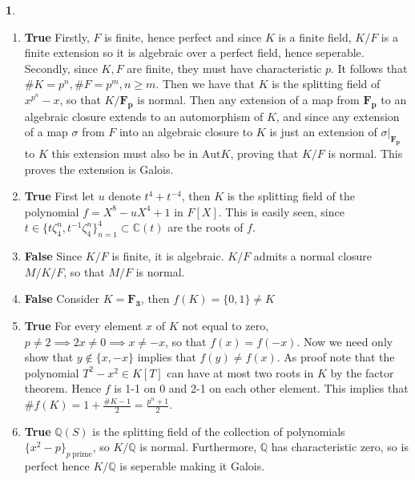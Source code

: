 \documentclass[11pt]{article}
\theoremstyle{definition}
\newtheorem{pb}{}
\newcommand{\set}[1]{\{#1\}}
\begin{document}
    \begin{pb}
        \begin{enumerate}
            \item \textbf{True} Firstly, \(F\) is finite, hence perfect and since \(K\) is a finite field, \(K/F\) is a finite extension so it is algebraic over a perfect field, hence seperable.
            Secondly, since \(K,F\) are finite, they must have characteristic \(p\). It follows that \(\# K = p^n, \# F = p^m, n \geq m\). Then we have that \(K\) is the splitting field of
            \(x^{p^n} - x\), so that \(K/\mathbf{F_p}\) is normal. Then any extension of a map from \(\mathbf{F_p}\) to an algebraic closure extends to an automorphism of \(K\), and since any extension of a map \(\sigma\)
            from \(F\) into an algebraic closure  to \(K\) is just an extension of \(\sigma\vert_{\mathbf{F_p}}\) to \(K\) this extension must also be in \(\text{Aut} K\), proving that \(K/F\) is normal. This proves the extension is Galois.
            \item \textbf{True} First let \(u\) denote \(t^4 + t^{-4}\), then \(K\) is the splitting field of the polynomial \(f = X^8 - uX^4 + 1\) in \(F[X]\). This is easily seen, since
            \(t \in \set{t\zeta_4^n,t^{-1}\zeta_4^n}_{n=1}^4 \subset \mathbb{C}(t)\) are the roots of \(f\).
            \item \textbf{False} Since \(K/F\) is finite, it is algebraic. \(K/F\) admits a normal closure \(M/K/F\), so that \(M/F\) is normal.
            \item \textbf{False} Consider \(K = \mathbf{F_3}\), then \(f(K) = \set{0,1} \neq K\)
            \item \textbf{True} For every element \(x\) of \(K\) not equal to zero, \(p \neq 2 \implies 2x \neq 0 \implies x \neq -x\), so that \(f(x) = f(-x)\). Now we need only show that
            \(y \not \in \set{x,-x}\) implies that \(f(y) \neq f(x)\). As proof note that the polynomial \(T^2 - x^2 \in K[T]\) can have at most two roots in \(K\) by the factor theorem.
            Hence \(f\) is 1-1 on 0 and 2-1 on each other element. This implies that \(\# f(K) = 1 + \frac{\# K - 1}{2} = \frac{p^n + 1}{2}\).
            \item \textbf{True} \(\mathbb{Q}(S)\) is the splitting field of the collection of polynomials \(\set{x^2 - p}_{p \; \text{prime}}\), so \(K/\mathbb{Q}\) is normal.
            Furthermore, \(\mathbb{Q}\) has characteristic zero, so is perfect hence \(K/\mathbb{Q}\) is seperable making it Galois.
        \end{enumerate}
    \end{pb}
\end{document}
